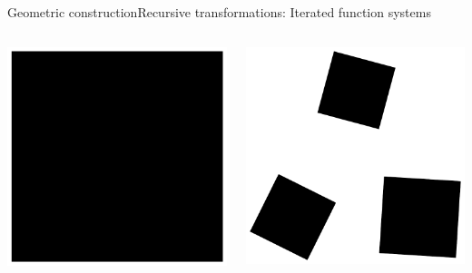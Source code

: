 \documentclass[xcolor=x11names,compress,professionalfonts]{beamer}
\renewcommand{\(}{\begin{columns}}
\renewcommand{\)}{\end{columns}}
\newcommand{\<}[1]{\begin{column}{#1}}
\renewcommand{\>}{\end{column}}
\begin{document}
\begin{frame}{Geometric construction}{Recursive transformations: Iterated function systems}
\begin{columns}
\newcommand{\s}{.2}
  \begin{column}{3cm}
    \includegraphics[scale=\s]{leaf0.pdf}
  \end{column}

  \begin{column}{3cm}
     \includegraphics[scale=\s]{leaf1.pdf}
  \end{column}
  

\end{columns}
\end{frame}
\end{document}
